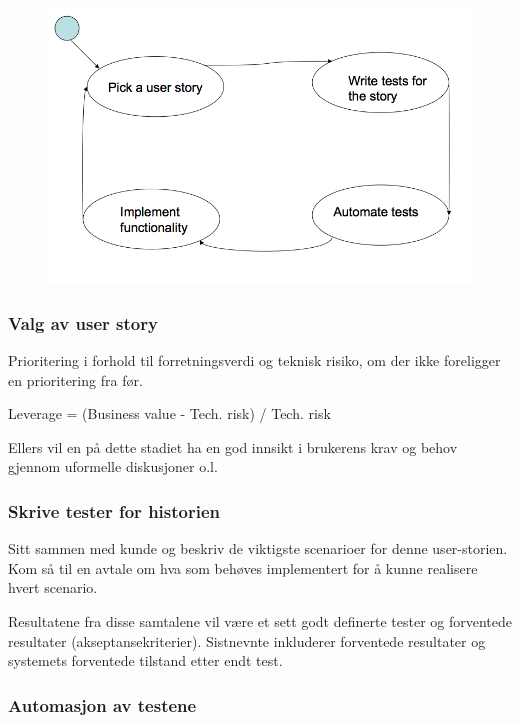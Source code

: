 \begin{figure}[htbp]
\centering
\includegraphics{Forelesning 12/img/1.png}
\caption{}
\end{figure}

\subsubsection{Valg av user story}

Prioritering i forhold til forretningsverdi og teknisk risiko, om der
ikke foreligger en prioritering fra før.

Leverage = (Business value - Tech. risk) / Tech. risk

Ellers vil en på dette stadiet ha en god innsikt i brukerens krav og
behov gjennom uformelle diskusjoner o.l.

\subsubsection{Skrive tester for historien}

Sitt sammen med kunde og beskriv de viktigste scenarioer for denne
user-storien. Kom så til en avtale om hva som behøves implementert for å
kunne realisere hvert scenario.

Resultatene fra disse samtalene vil være et sett godt definerte tester
og forventede resultater (akseptansekriterier). Sistnevnte inkluderer
forventede resultater og systemets forventede tilstand etter endt test.

\subsubsection{Automasjon av testene}


